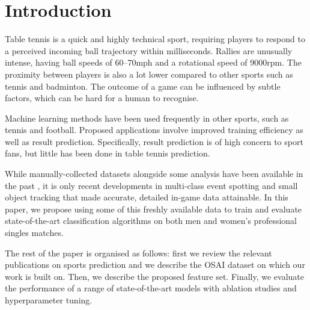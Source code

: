 \section{Introduction}
Table tennis is a quick and highly technical sport, requiring players to respond to a perceived incoming ball trajectory within milliseconds. Rallies are unusually intense,  having ball speeds of 60--70mph and a rotational speed of 9000rpm. The proximity between players is also a lot lower compared to other sports such as tennis and badminton. The  outcome of a game can be influenced by subtle factors, which can be hard for a human to recognise.

Machine learning methods have been used frequently  in other sports, such as tennis and football. Proposed applications involve improved training efficiency 
as well as result prediction. Specifically, result prediction is of high concern to sport fans, but little has been done in table tennis prediction.


While manually-collected datasets alongside some analysis have been available in the past \cite{wang2019tac}, it is only recent developments in  multi-class event spotting and small object tracking that made accurate, detailed in-game data attainable.
In this paper, we propose using some of this freshly available data to train and evaluate  state-of-the-art classification algorithms on both men and women's professional singles matches. %



The rest of the paper is organised as follows: first we review the relevant publications on sports prediction and we describe the OSAI dataset on which our work is built on. Then, we describe the proposed feature set. Finally, we evaluate the performance of a range of state-of-the-art models with ablation studies and hyperparameter tuning.